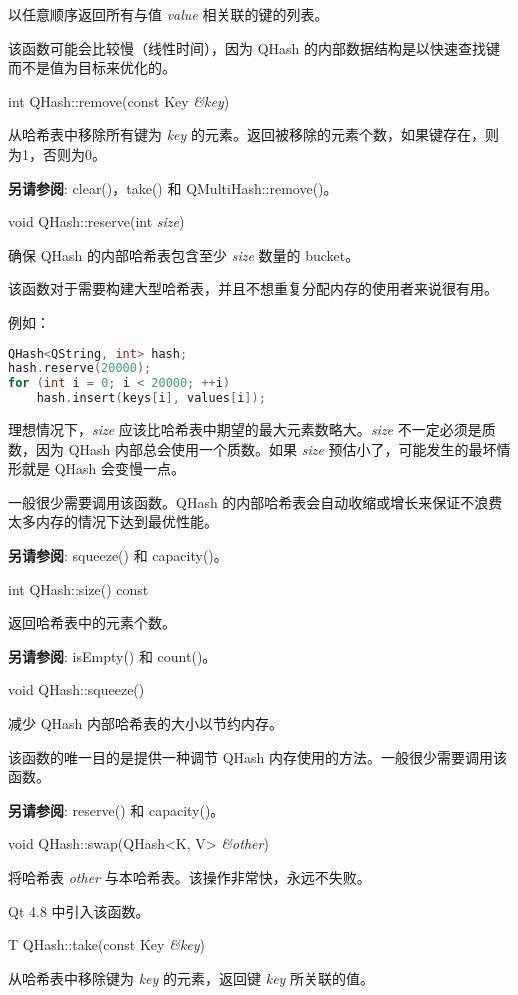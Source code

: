 以任意顺序返回所有与值 \emph{value} 相关联的键的列表。

该函数可能会比较慢（线性时间），因为 QHash 的内部数据结构是以快速查找键而不是值为目标来优化的。

int QHash::remove(const Key \emph{\&key})

从哈希表中移除所有键为 \emph{key} 的元素。返回被移除的元素个数，如果键存在，则为1，否则为0。

\textbf{另请参阅}: clear()，take() 和 QMultiHash::remove()。

void QHash::reserve(int \emph{size})

确保 QHash 的内部哈希表包含至少 \emph{size} 数量的 bucket。

该函数对于需要构建大型哈希表，并且不想重复分配内存的使用者来说很有用。

例如：

\begin{lstlisting}[language=C++]
QHash<QString, int> hash;
hash.reserve(20000);
for (int i = 0; i < 20000; ++i)
    hash.insert(keys[i], values[i]);
\end{lstlisting}

理想情况下，\emph{size} 应该比哈希表中期望的最大元素数略大。\emph{size} 不一定必须是质数，因为 QHash 内部总会使用一个质数。如果 \emph{size} 预估小了，可能发生的最坏情形就是 QHash 会变慢一点。

一般很少需要调用该函数。QHash 的内部哈希表会自动收缩或增长来保证不浪费太多内存的情况下达到最优性能。

\textbf{另请参阅}: squeeze() 和 capacity()。

int QHash::size() const

返回哈希表中的元素个数。

\textbf{另请参阅}: isEmpty() 和 count()。

void QHash::squeeze()

减少 QHash 内部哈希表的大小以节约内存。

该函数的唯一目的是提供一种调节 QHash 内存使用的方法。一般很少需要调用该函数。

\textbf{另请参阅}: reserve() 和 capacity()。

void QHash::swap(QHash<K, V> \emph{\&other})

将哈希表 \emph{other} 与本哈希表。该操作非常快，永远不失败。

Qt 4.8 中引入该函数。

T QHash::take(const Key \emph{\&key})

从哈希表中移除键为 \emph{key} 的元素，返回键 \emph{key} 所关联的值。

